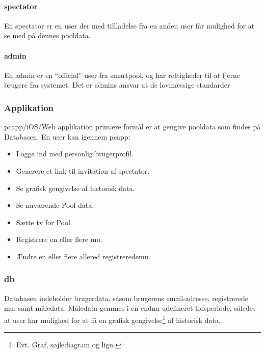 \paragraph{\Gls{spectator}}
En \gls{spectator} er en \gls{user} der med tillladelse fra en anden \gls{user} får mulighed for at se med på dennes pooldata. 

\paragraph{\gls{admin}}
En \gls{admin} er en “official” user fra \gls{smartpool}, og har rettigheder til at fjerne brugere fra systemet. Det er \glspl{admin} ansvar at de lovmæssige standarder%
	
\subsubsection{Applikation}
\gls{pcapp}/iOS/Web applikation primære formål er at gengive pooldata som findes på Databasen. En \gls{user} kan igennem \gls{pcapp}:

\begin{itemize}
	\item Logge ind med personlig brugerprofil.
	\item Generere et link til invitation af \gls{spectator}.
	\item Se grafisk gengivelse af historisk data.
	\item Se nuværende Pool data.
	\item Sætte \gls{tv} for Pool.
	\item Registrere en eller flere \gls{mu}.
	\item Ændre en eller flere allered registrerede\gls{mu}.
\end{itemize}

\subsubsection{\gls{db}}
Databasen indeholder brugerdata, såsom brugerens email-adresse, registrerede \gls{mu}, samt måledata. Måledata gemmes i en endnu udefineret tidsperiode, således at \gls{user} har mulighed for at få en grafisk gengivelse\footnote{Evt. Graf, søjlediagram og lign.} af historisk data.

